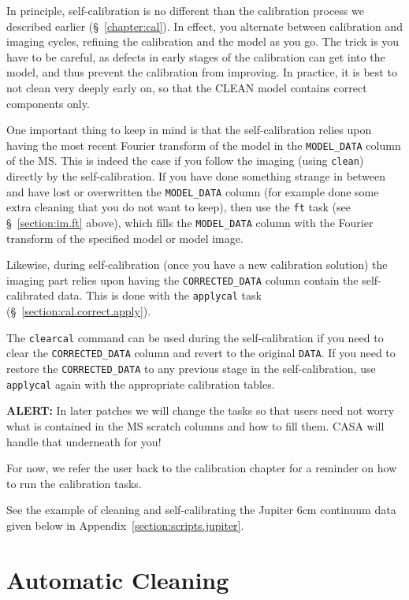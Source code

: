 In principle, self-calibration is no different than the calibration
process we described earlier (\S~\ref{chapter:cal}).  In effect, you
alternate between calibration and imaging cycles, refining the calibration
and the model as you go.  The trick is you have to be careful, as defects
in early stages of the calibration can get into the model, and thus
prevent the calibration from improving.  In practice, it is best to
not clean very deeply early on, so that the CLEAN model contains
correct components only.  

One important thing to keep in mind is that the self-calibration
relies upon having the most recent Fourier transform of the
model in the {\tt MODEL\_DATA} column of the MS.  This is indeed
the case if you follow the imaging (using {\tt clean})
directly by the self-calibration.  If you have done something strange
in between and have lost or overwritten the {\tt MODEL\_DATA} column
(for example done some extra cleaning that you do not want to keep),
then use the {\tt ft} task (see \S~\ref{section:im.ft} above), which 
fills the {\tt MODEL\_DATA} column with the Fourier transform of the
specified model or model image.  

Likewise, during self-calibration (once you have a new calibration
solution) the imaging part
relies upon having the {\tt CORRECTED\_DATA} column contain
the self-calibrated data.  This is done with the {\tt applycal}
task (\S~\ref{section:cal.correct.apply}).  

The {\tt clearcal} command can be used during the self-calibration if
you need to clear the {\tt CORRECTED\_DATA} column and revert to the
original {\tt DATA}.  If you need to restore the {\tt CORRECTED\_DATA}
to any previous stage in the self-calibration, use {\tt applycal}
again with the appropriate calibration tables.

{\bf ALERT:} In later patches we
will change the tasks so that users need not worry what is contained in
the MS scratch columns and how to fill them.  CASA will handle that 
underneath for you!

For now, we refer the user back to the calibration chapter for
a reminder on how to run the calibration tasks. 

See the example of cleaning and self-calibrating the Jupiter 6cm continuum
data given below in Appendix~\ref{section:scripts.jupiter}.  

\section{Automatic Cleaning}
\label{section:im.autoclean}

